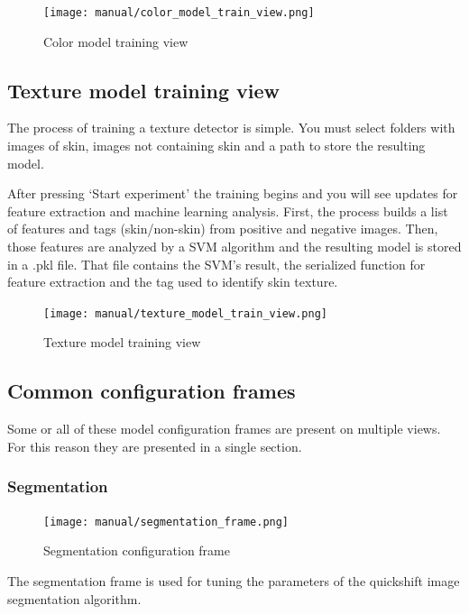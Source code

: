 \documentclass[12pt]{report}
\begin{document}
	\begin{figure}[h!]
		\centering
		\texttt{[image: manual/color\_model\_train\_view.png]}
		\caption{Color model training view}
	\end{figure}
	
	\subsection{Texture model training view}
	The process of training a texture detector is simple. You must select folders with images of skin, images not containing skin and a path to store the resulting model.
	
	After pressing ‘Start experiment’ the training begins and you will see updates for feature extraction and machine learning analysis. First, the process builds a list of features and tags (skin/non-skin) from positive and negative images. Then, those features are analyzed by a SVM algorithm and the resulting model is stored in a .pkl file. That file contains the SVM's result, the serialized function for feature extraction and the tag used to identify skin texture.
	
	\begin{figure}[h!]
		\centering
		\texttt{[image: manual/texture\_model\_train\_view.png]}
		\caption{Texture model training view}
	\end{figure}
	
	\subsection{Common configuration frames} \label{configuration_frames}
	Some or all of these model configuration frames are present on multiple views. For this reason they are presented in a single section.
	
	\subsubsection{Segmentation}
	
	\begin{figure}
		\begin{center}
			\texttt{[image: manual/segmentation\_frame.png]}
		\end{center}
		\caption{Segmentation configuration frame}
	\end{figure}
	
	The segmentation frame is used for tuning the parameters of the quickshift image segmentation algorithm. 
	
\end{document}
